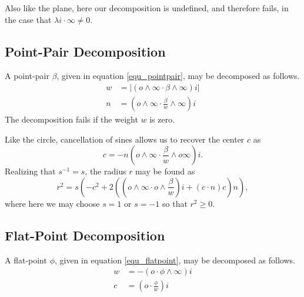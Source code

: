 \documentclass[12pt]{article}
\newcommand{\nvao}{o}
\newcommand{\nvai}{\infty}
\begin{document}
Also like the plane, here our decomposition is undefined,
and therefore fails, in the case that $\lambda i\cdot\nvai\neq 0$.

\subsection{Point-Pair Decomposition}

A point-pair $\beta$, given in equation \eqref{equ_pointpair}, may be
decomposed as follows.
\begin{align}
w &= |(\nvao\wedge\nvai\cdot\beta\wedge\nvai)i| \\
n &= \left(\nvao\wedge\nvai\cdot\frac{\beta}{w}\wedge\nvai\right)i
\end{align}
The decomposition fails if the weight $w$ is zero.

Like the circle, cancellation of sines allows us to recover the center $c$ as
\begin{equation}
c = -n\left(\nvao\wedge\nvai\cdot\frac{\beta}{w}\wedge\nvao\nvai\right)i.
\end{equation}
Realizing that $s^{-1}=s$, the radius $r$ may be found as
\begin{equation}
r^2 = s\left(-c^2 + 2\left(\left(\nvao\wedge\nvai\cdot\nvao\wedge\frac{\beta}{w}\right)i+(c\cdot n)c\right)n\right),
\end{equation}
where here we may choose $s=1$ or $s=-1$ so that $r^2\geq 0$.

\subsection{Flat-Point Decomposition}

A flat-point $\phi$, given in equation \eqref{equ_flatpoint}, may be decomposed as follows.
\begin{align}
w &= -(\nvao\cdot\phi\wedge\nvai)i \\
c &= \left(\nvao\cdot\frac{\phi}{w}\right)i
\end{align}
\end{document}
